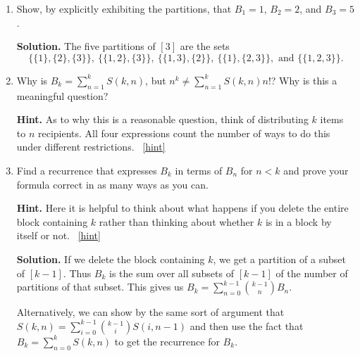 \documentclass{book}
\begin{document}
\setcounter{project}{206}
\addtocounter{project}{-1}
\begin{activity}[]\label{BellNumberIntro}
\leavevmode%
\begin{enumerate}[font=\bfseries,label=(\alph*),ref=\alph*]
\item\label{task-215} \hypertarget{p-1124}{}%
Show, by explicitly exhibiting the partitions, that \(B_1 = 1\), \(B_2 = 2\), and \(B_3 = 5\).%
\par\smallskip%
\noindent\textbf{Solution.}\hypertarget{solution-95}{}\quad%
\hypertarget{p-1125}{}%
The five partitions of \([3]\) are the sets%
\begin{equation*}
\{\{1\},
\{2\},\{3\}\},\
\{\{1,2\},\{3\}\},\ \{\{1,3\},\{2\}\},\ \{\{1\},\{2,3\}\},\text{ and }
\{\{1,2,3\}\}\text{.}
\end{equation*}
%
\item\label{task-216} \hypertarget{p-1126}{}%
Why is \(B_k = \sum_{n=1}^{k} S(k,n)\), but \(n^k \ne \sum_{n=1}^k S(k,n)n!\)?  Why is this a meaningful question?%
\par\smallskip%
\noindent\textbf{Hint.}\hypertarget{hint-130}{}\quad%
\hypertarget{p-1127}{}%
As to why this is a reasonable question, think of distributing \(k\) items to \(n\) recipients.  All four expressions count the number of ways to do this under different restrictions.%
~\hfill{\tiny\hyperlink{a-206.b}{[hint]}\hypertarget{q-206.b}{}}\item\label{task-217} \hypertarget{p-1128}{}%
Find a recurrence that expresses \(B_k\) in terms of \(B_n\) for \(n\lt  k\) and prove your formula correct in as many ways as you can.%
\par\smallskip%
\noindent\textbf{Hint.}\hypertarget{hint-131}{}\quad%
\hypertarget{p-1129}{}%
Here it is helpful to think about what happens if you delete the entire block containing \(k\) rather than thinking about whether \(k\) is in a block by itself or not.%
~\hfill{\tiny\hyperlink{a-206.c}{[hint]}\hypertarget{q-206.c}{}}\par\smallskip%
\noindent\textbf{Solution.}\hypertarget{solution-96}{}\quad%
\hypertarget{p-1130}{}%
If we delete the block containing \(k\), we get a partition of a subset of \([k-1]\). Thus \(B_k\) is the sum over all subsets of \([k-1]\) of the number of partitions of that subset. This gives us \(B_k= \sum_{n=0}^{k-1}\binom{k-1}{n}B_n\).%
\par
\hypertarget{p-1131}{}%
Alternatively, we can show by the same sort of argument that \(S(k,n)=\sum_{i=0}^{k-1} \binom{k-1}{i}S(i,n-1)\) and then use the fact that \(B_k =\sum_{n=0}^k S(k,n)\) to get the recurrence for \(B_k\).%

\end{enumerate}
\end{activity}
\end{document}
